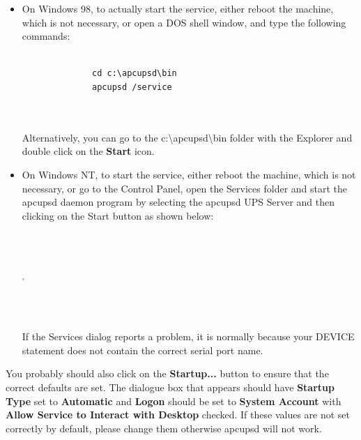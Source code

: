 {{{{{{{{{{\begin{itemize}
\footnotesize
\begin{verbatim}
     
     
\end{verbatim}
\normalsize

\item On Windows 98, to actually start the service, either reboot the machine,
which is not necessary, or open a DOS shell window, and type the following
commands:  

\footnotesize
\begin{verbatim}
          
              cd c:\apcupsd\bin
              apcupsd /service
          
     
\end{verbatim}
\normalsize

Alternatively, you can go to the c:\textbackslash{}apcupsd\textbackslash{}bin
folder with the Explorer and double click on the {\bf Start} icon.  
\item On Windows NT, to start the service, either reboot the machine, which is
not necessary, or go to the Control Panel, open the Services folder and start
the apcupsd daemon program by selecting the apcupsd UPS Server and then
clicking on the Start button as shown below:  

\footnotesize
\begin{verbatim}
     
     
\end{verbatim}
\normalsize

\includegraphics{./wininstall6.eps}  

\footnotesize
\begin{verbatim}
     
     
\end{verbatim}
\normalsize

If the Services dialog reports a problem, it is normally because your DEVICE
statement does not contain the correct serial port name. 
\end{itemize}

You probably should also click on the {\bf Startup...} button to ensure that
the correct defaults are set. The dialogue box that appears should have {\bf
Startup Type} set to {\bf Automatic} and {\bf Logon} should be set to {\bf
System Account} with {\bf Allow Service to Interact with Desktop} checked. If
these values are not set correctly by default, please change them otherwise
apcupsd will not work.  

}}}}}}}}}}

